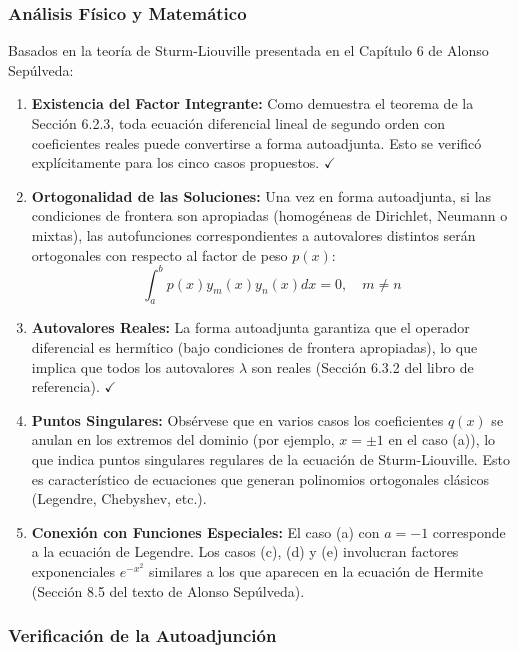 \documentclass[a4paper]{article}
\begin{document}
\subsubsection{Análisis Físico y Matemático}

Basados en la teoría de Sturm-Liouville presentada en el Capítulo 6 de Alonso Sepúlveda:

\begin{enumerate}
    \item \textbf{Existencia del Factor Integrante:} Como demuestra el teorema de la Sección 6.2.3, toda ecuación diferencial lineal de segundo orden con coeficientes reales puede convertirse a forma autoadjunta. Esto se verificó explícitamente para los cinco casos propuestos. $\checkmark$
    
    \item \textbf{Ortogonalidad de las Soluciones:} Una vez en forma autoadjunta, si las condiciones de frontera son apropiadas (homogéneas de Dirichlet, Neumann o mixtas), las autofunciones correspondientes a autovalores distintos serán ortogonales con respecto al factor de peso $p(x)$:
    $$
    \int_a^b p(x) y_m(x) y_n(x) dx = 0, \quad m \neq n
    $$
    
    \item \textbf{Autovalores Reales:} La forma autoadjunta garantiza que el operador diferencial es hermítico (bajo condiciones de frontera apropiadas), lo que implica que todos los autovalores $\lambda$ son reales (Sección 6.3.2 del libro de referencia). $\checkmark$
    
    \item \textbf{Puntos Singulares:} Obsérvese que en varios casos los coeficientes $q(x)$ se anulan en los extremos del dominio (por ejemplo, $x = \pm 1$ en el caso (a)), lo que indica puntos singulares regulares de la ecuación de Sturm-Liouville. Esto es característico de ecuaciones que generan polinomios ortogonales clásicos (Legendre, Chebyshev, etc.).
    
    \item \textbf{Conexión con Funciones Especiales:} El caso (a) con $a = -1$ corresponde a la ecuación de Legendre. Los casos (c), (d) y (e) involucran factores exponenciales $e^{-x^2}$ similares a los que aparecen en la ecuación de Hermite (Sección 8.5 del texto de Alonso Sepúlveda).
\end{enumerate}

\subsubsection{Verificación de la Autoadjunción}
\end{document}
